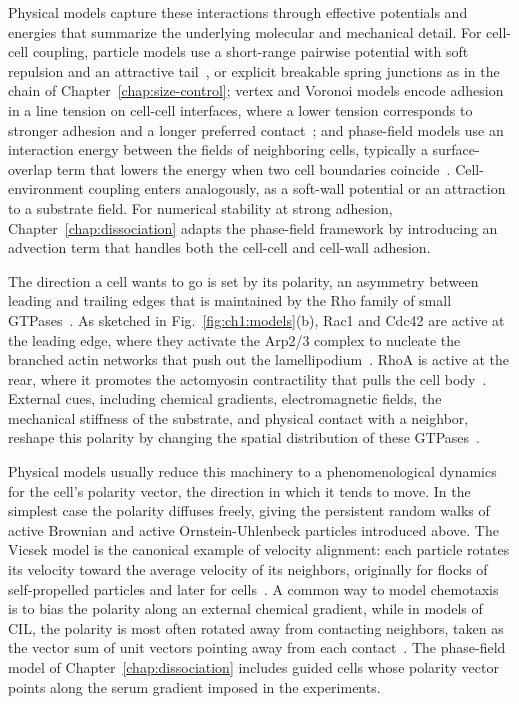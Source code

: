 Physical models capture these interactions through effective potentials and energies that summarize the underlying molecular and mechanical detail.
For cell-cell coupling, particle models use a short-range pairwise potential with soft repulsion and an attractive tail~\cite{sanoria2026chemotaxis, copenhagen2018frustration}, or explicit breakable spring junctions as in the chain of Chapter~\ref{chap:size-control}; vertex and Voronoi models encode adhesion in a line tension on cell-cell interfaces, where a lower tension corresponds to stronger adhesion and a longer preferred contact~\cite{bi2015density, bi2016motility, huang2023bridging}; and phase-field models use an interaction energy between the fields of neighboring cells, typically a surface-overlap term that lowers the energy when two cell boundaries coincide~\cite{zadeh2024inferring, camley2014polarity}.
Cell-environment coupling enters analogously, as a soft-wall potential or an attraction to a substrate field.
For numerical stability at strong adhesion, Chapter~\ref{chap:dissociation} adapts the phase-field framework by introducing an advection term that handles both the cell-cell and cell-wall adhesion.

The direction a cell wants to go is set by its polarity, an asymmetry between leading and trailing edges that is maintained by the Rho family of small GTPases~\cite{rappel2017mechanisms}.
As sketched in Fig.~\ref{fig:ch1:models}(b), Rac1 and Cdc42 are active at the leading edge, where they activate the Arp2/3 complex to nucleate the branched actin networks that push out the lamellipodium~\cite{demali2003coupling, ananthakrishnan2007forces}.
RhoA is active at the rear, where it promotes the actomyosin contractility that pulls the cell body~\cite{rappel2017mechanisms, ananthakrishnan2007forces}.
External cues, including chemical gradients, electromagnetic fields, the mechanical stiffness of the substrate, and physical contact with a neighbor, reshape this polarity by changing the spatial distribution of these GTPases~\cite{rappel2017mechanisms, demali2003coupling, nwogbaga2023physical, klein2012eph}.

Physical models usually reduce this machinery to a phenomenological dynamics for the cell's polarity vector, the direction in which it tends to move.
In the simplest case the polarity diffuses freely, giving the persistent random walks of active Brownian and active Ornstein-Uhlenbeck particles introduced above.
The Vicsek model is the canonical example of velocity alignment: each particle rotates its velocity toward the average velocity of its neighbors, originally for flocks of self-propelled particles and later for cells~\cite{vicsek1995novel}.
A common way to model chemotaxis is to bias the polarity along an external chemical gradient, while in models of CIL, the polarity is most often rotated away from contacting neighbors, taken as the vector sum of unit vectors pointing away from each contact~\cite{camley2016emergent, ipina2022collective, sanoria2026chemotaxis, copenhagen2018frustration}.
The phase-field model of Chapter~\ref{chap:dissociation} includes guided cells whose polarity vector points along the serum gradient imposed in the experiments.



